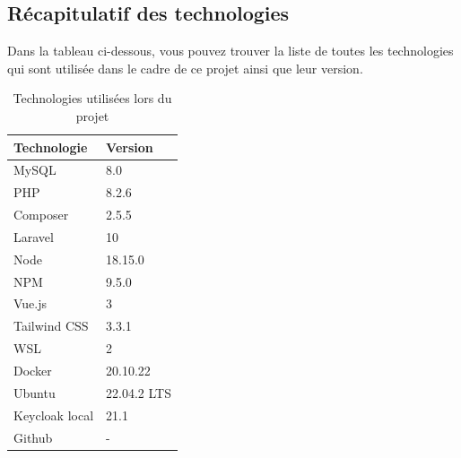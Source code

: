 \subsection{Récapitulatif des technologies}
Dans la tableau ci-dessous, vous pouvez trouver la liste de toutes les technologies qui sont utilisée dans le cadre de ce projet ainsi que leur version.
\begin{table}[h]
  \begin{center}
    \caption{Technologies utilisées lors du projet \label{stack}}
    \begin{tabular}{|l|l|}
      \hline
      \textbf{Technologie} & \textbf{Version} \\
      \hline
      MySQL                & 8.0              \\
      \hline
      PHP                  & 8.2.6            \\
      \hline
      Composer             & 2.5.5            \\
      \hline
      Laravel              & 10               \\
      \hline
      Node                 & 18.15.0          \\
      \hline
      NPM                  & 9.5.0            \\
      \hline
      Vue.js               & 3                \\
      \hline
      Tailwind CSS         & 3.3.1            \\
      \hline
      WSL                  & 2                \\
      \hline
      Docker               & 20.10.22         \\
      \hline
      Ubuntu               & 22.04.2 LTS      \\
      \hline
      Keycloak local       & 21.1             \\
      \hline
      Github               & -                \\
      \hline
    \end{tabular}
  \end{center}
\end{table}